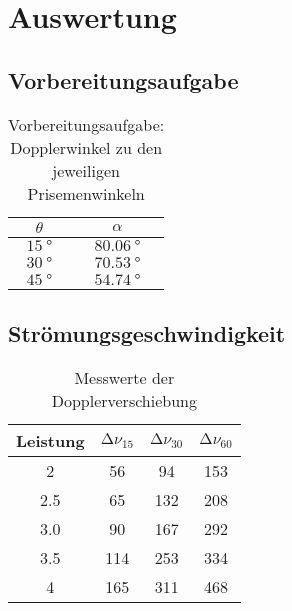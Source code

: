 \section{Auswertung}
\label{sec:auswertung}

\subsection{Vorbereitungsaufgabe}
\label{sec:Vorbereitungsaufgabe}

\begin{table}
    \centering
    \caption{Vorbereitungsaufgabe: Dopplerwinkel zu den jeweiligen Prisemenwinkeln}
\begin{tabular}{c c}
    \toprule
    $\theta$ & $\alpha$ \\
    \midrule
    $\qty{15}{°}$ & $\qty{80.06}{°}$ \\
    $\qty{30}{°}$ & $\qty{70.53}{°}$ \\
    $\qty{45}{°}$ & $\qty{54.74}{°}$ \\
    \bottomrule
\end{tabular}
\end{table}

\subsection{Strömungsgeschwindigkeit}
\label{sec:Strömungsgeschwindigkeit}

\begin{table}
    \centering
    \caption{Messwerte der Dopplerverschiebung}
\begin{tabular}{c c c c}
    \toprule
     Leistung & $\increment\nu_15$ & $\increment \nu_30$ & $\increment \nu_60$ \\
    \midrule
       2 &  56 &  94 & 153 \\
     2.5 &  65 & 132 & 208 \\
     3.0 &  90 & 167 & 292 \\
     3.5 & 114 & 253 & 334 \\
       4 & 165 & 311 & 468 \\
    \bottomrule
\end{tabular}
\end{table}
